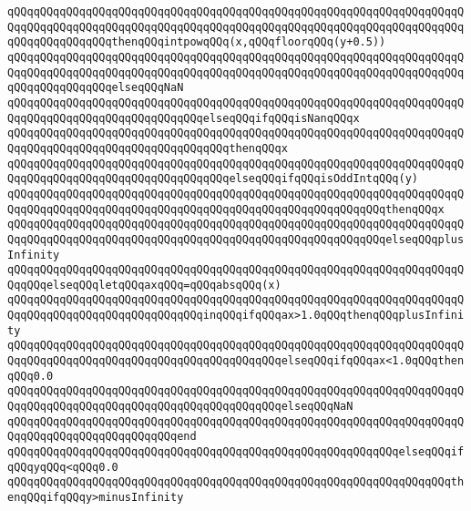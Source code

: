 \verb|qQQqqQQqqQQqqQQqqQQqqQQqqQQqqQQqqQQqqQQqqQQqqQQqqQQqqQQqqQQqqQQqqQQqqQQqqQQqqQQqqQQqqQQqqQQqqQQqqQQqqQQqqQQqqQQqqQQqqQQqqQQqqQQqqQQqqQQqqQQqqQQqqQQqqQQqqQQqthenqQQqintpowqQQq(x,qQQqfloorqQQq(y+0.5))|\newline
\verb|qQQqqQQqqQQqqQQqqQQqqQQqqQQqqQQqqQQqqQQqqQQqqQQqqQQqqQQqqQQqqQQqqQQqqQQqqQQqqQQqqQQqqQQqqQQqqQQqqQQqqQQqqQQqqQQqqQQqqQQqqQQqqQQqqQQqqQQqqQQqqQQqqQQqqQQqqQQqelseqQQqNaN|\newline
\verb|qQQqqQQqqQQqqQQqqQQqqQQqqQQqqQQqqQQqqQQqqQQqqQQqqQQqqQQqqQQqqQQqqQQqqQQqqQQqqQQqqQQqqQQqqQQqqQQqqQQqelseqQQqifqQQqisNanqQQqx|\newline
\verb|qQQqqQQqqQQqqQQqqQQqqQQqqQQqqQQqqQQqqQQqqQQqqQQqqQQqqQQqqQQqqQQqqQQqqQQqqQQqqQQqqQQqqQQqqQQqqQQqqQQqqQQqthenqQQqx|\newline
\verb|qQQqqQQqqQQqqQQqqQQqqQQqqQQqqQQqqQQqqQQqqQQqqQQqqQQqqQQqqQQqqQQqqQQqqQQqqQQqqQQqqQQqqQQqqQQqqQQqqQQqqQQqelseqQQqifqQQqisOddIntqQQq(y)|\newline
\verb|qQQqqQQqqQQqqQQqqQQqqQQqqQQqqQQqqQQqqQQqqQQqqQQqqQQqqQQqqQQqqQQqqQQqqQQqqQQqqQQqqQQqqQQqqQQqqQQqqQQqqQQqqQQqqQQqqQQqqQQqqQQqqQQqthenqQQqx|\newline
\verb|qQQqqQQqqQQqqQQqqQQqqQQqqQQqqQQqqQQqqQQqqQQqqQQqqQQqqQQqqQQqqQQqqQQqqQQqqQQqqQQqqQQqqQQqqQQqqQQqqQQqqQQqqQQqqQQqqQQqqQQqqQQqqQQqelseqQQqplusInfinity|\newline
\verb|qQQqqQQqqQQqqQQqqQQqqQQqqQQqqQQqqQQqqQQqqQQqqQQqqQQqqQQqqQQqqQQqqQQqqQQqqQQqelseqQQqletqQQqaxqQQq=qQQqabsqQQq(x)|\newline
\verb|qQQqqQQqqQQqqQQqqQQqqQQqqQQqqQQqqQQqqQQqqQQqqQQqqQQqqQQqqQQqqQQqqQQqqQQqqQQqqQQqqQQqqQQqqQQqqQQqqQQqinqQQqifqQQqax>1.0qQQqthenqQQqplusInfinity|\newline
\verb|qQQqqQQqqQQqqQQqqQQqqQQqqQQqqQQqqQQqqQQqqQQqqQQqqQQqqQQqqQQqqQQqqQQqqQQqqQQqqQQqqQQqqQQqqQQqqQQqqQQqqQQqqQQqqQQqelseqQQqifqQQqax<1.0qQQqthenqQQq0.0|\newline
\verb|qQQqqQQqqQQqqQQqqQQqqQQqqQQqqQQqqQQqqQQqqQQqqQQqqQQqqQQqqQQqqQQqqQQqqQQqqQQqqQQqqQQqqQQqqQQqqQQqqQQqqQQqqQQqqQQqelseqQQqNaN|\newline
\verb|qQQqqQQqqQQqqQQqqQQqqQQqqQQqqQQqqQQqqQQqqQQqqQQqqQQqqQQqqQQqqQQqqQQqqQQqqQQqqQQqqQQqqQQqqQQqqQQqend|\newline
\verb|qQQqqQQqqQQqqQQqqQQqqQQqqQQqqQQqqQQqqQQqqQQqqQQqqQQqqQQqqQQqelseqQQqifqQQqyqQQq<qQQq0.0|\newline
\verb|qQQqqQQqqQQqqQQqqQQqqQQqqQQqqQQqqQQqqQQqqQQqqQQqqQQqqQQqqQQqqQQqqQQqthenqQQqifqQQqy>minusInfinity|\newline

